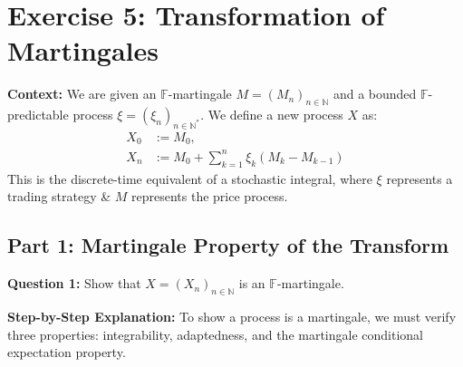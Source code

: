 \section{Exercise 5: Transformation of Martingales}

\textbf{Context:} We are given an $\mathbb{F}$-martingale $M = (M_n)_{n\in\mathbb{N}}$ and a bounded $\mathbb{F}$-predictable process $\xi = (\xi_n)_{n\in\mathbb{N}^*}$. We define a new process $X$ as:
\begin{align*}
X_0 &:= M_0, \\
X_n &:= M_0 + \sum_{k=1}^n \xi_k(M_k - M_{k-1})
\end{align*}
This is the discrete-time equivalent of a stochastic integral, where $\xi$ represents a trading strategy \& $M$ represents the price process.

\subsection{Part 1: Martingale Property of the Transform}

\textbf{Question 1:} Show that $X = (X_n)_{n\in\mathbb{N}}$ is an $\mathbb{F}$-martingale.

\textbf{Step-by-Step Explanation:}
To show a process is a martingale, we must verify three properties: integrability, adaptedness, and the martingale conditional expectation property.

